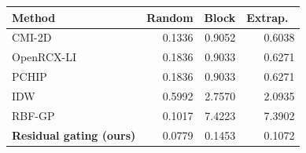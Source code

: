 \small
\begin{tabular}{lrrr}\toprule
Method & Random & Block & Extrap.\ \\\midrule
CMI-2D & 0.1336 & 0.9052 & 0.6038 \\
OpenRCX-LI & 0.1836 & 0.9033 & 0.6271 \\
PCHIP & 0.1836 & 0.9033 & 0.6271 \\
IDW & 0.5992 & 2.7570 & 2.0935 \\
RBF-GP & 0.1017 & 7.4223 & 7.3902 \\
\textbf{Residual gating (ours)} & 0.0779 & 0.1453 & 0.1072 \\
\bottomrule\end{tabular}
